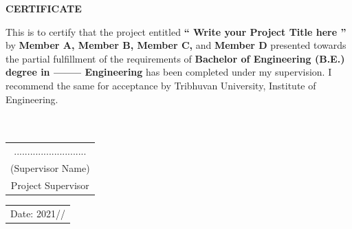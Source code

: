 \documentclass[a4paper, 12pt ]{report}
\begin{document}
	
	\newpage
	\cleardoublepage
	\setcounter{page}{2}
	\begin{center}\fontsize{18}{0} \textbf{CERTIFICATE}\end{center}
	\vspace*{\baselineskip}
	{ This is to certify that the project entitled {\bf `` Write your Project Title here ”}  by {\bf Member A, Member B, Member C,} and {\bf Member D} presented towards the partial fulfillment of the requirements of {\bf Bachelor of Engineering (B.E.) degree in -------- Engineering } has been completed under my supervision. I recommend the same for acceptance by Tribhuvan University, Institute of Engineering. }
	\\
	\\
	\\
	{\begin{flushright}
			\begin{tabular}{ c }
				........................... \\ 
				(Supervisor Name)  \\  
				Project Supervisor      
			\end{tabular}
			
	\end{flushright}}
	{ \begin{flushleft}
			\begin{tabular}{ c }
				Date: 2021/\hspace{15pt}/   
			\end{tabular}
			
	\end{flushleft}}

	\pagebreak
	
	
\end{document}
